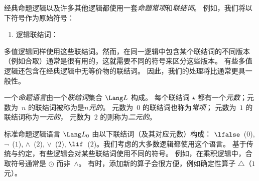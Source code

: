 \documentclass[../../../include/open-logic-section]{subfiles}
\begin{document}


经典命题逻辑以及许多其他逻辑都使用一套\emph{命题常项}和\emph{联结词}。
例如，我们将以下符号作为原始符号：

\begin{enumerate}
\item 逻辑联结词：
  \startycommalist
\end{enumerate}



多值逻辑同样使用这些联结词。然而，在同一逻辑中包含某个联结词的不同版本（例如合取）通常是很有用的，这就需要不同的符号来区分这些版本。
有些多值逻辑还包含在经典逻辑中无等价物的联结词。
因此，我们的处理将比通常更具一般性。

\begin{defn}
  一个\emph{命题语言}由一个\emph{联结词}集合 $\Lang L$ 构成。
  每个联结词 $\star$ 都有一个\emph{元数}；元数为~$n$ 的联结词被称为是\emph{$n$元的}。
  元数为~$0$ 的联结词也称为\emph{常项}；
  元数为~$1$ 的联结词称为\emph{一元的}，
  元数为~$2$ 的则称为\emph{二元的}。
\end{defn}

\begin{ex}
  标准命题逻辑语言 $\Lang L_0$ 由以下联结词（及其对应元数）构成：
  $\lfalse$~($0$),
  $\lnot$~($1$),
  $\land$~($2$),
  $\lor$~($2$),
  $\lif$~($2$)。我们考虑的大多数逻辑都使用这个语言。
  基于传统与约定，有些逻辑会对某些联结词使用不同的符号。
  例如，在乘积逻辑中，合取符号通常是 $\odot$ 而非~$\land$。
  有时，添加新的算子会很方便，例如确定性算子 $\triangle$（$1$元）。
\end{ex}
\end{document}
